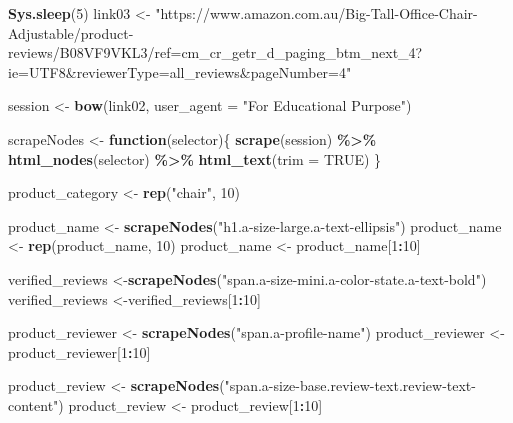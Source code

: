 \documentclass[
]{article}
\newenvironment{Shaded}{\begin{snugshade}}{\end{snugshade}}
\newcommand{\AttributeTok}[1]{\textcolor[rgb]{0.13,0.29,0.53}{#1}}
\newcommand{\ConstantTok}[1]{\textcolor[rgb]{0.56,0.35,0.01}{#1}}
\newcommand{\ControlFlowTok}[1]{\textcolor[rgb]{0.13,0.29,0.53}{\textbf{#1}}}
\newcommand{\DecValTok}[1]{\textcolor[rgb]{0.00,0.00,0.81}{#1}}
\newcommand{\FunctionTok}[1]{\textcolor[rgb]{0.13,0.29,0.53}{\textbf{#1}}}
\newcommand{\NormalTok}[1]{#1}
\newcommand{\OtherTok}[1]{\textcolor[rgb]{0.56,0.35,0.01}{#1}}
\newcommand{\SpecialCharTok}[1]{\textcolor[rgb]{0.81,0.36,0.00}{\textbf{#1}}}
\newcommand{\StringTok}[1]{\textcolor[rgb]{0.31,0.60,0.02}{#1}}
\begin{document}
\begin{Shaded}
\begin{Highlighting}[]
   \FunctionTok{Sys.sleep}\NormalTok{(}\DecValTok{5}\NormalTok{)}
\NormalTok{link03 }\OtherTok{\textless{}{-}} \StringTok{"https://www.amazon.com.au/Big{-}Tall{-}Office{-}Chair{-}Adjustable/product{-}reviews/B08VF9VKL3/ref=cm\_cr\_getr\_d\_paging\_btm\_next\_4?ie=UTF8\&reviewerType=all\_reviews\&pageNumber=4"}


\NormalTok{  session }\OtherTok{\textless{}{-}} \FunctionTok{bow}\NormalTok{(link02,}
               \AttributeTok{user\_agent =} \StringTok{"For Educational Purpose"}\NormalTok{)}

\NormalTok{  scrapeNodes }\OtherTok{\textless{}{-}} \ControlFlowTok{function}\NormalTok{(selector)\{}
    \FunctionTok{scrape}\NormalTok{(session) }\SpecialCharTok{\%\textgreater{}\%}
      \FunctionTok{html\_nodes}\NormalTok{(selector) }\SpecialCharTok{\%\textgreater{}\%}
      \FunctionTok{html\_text}\NormalTok{(}\AttributeTok{trim =} \ConstantTok{TRUE}\NormalTok{)}
\NormalTok{  \}}

\NormalTok{  product\_category }\OtherTok{\textless{}{-}} \FunctionTok{rep}\NormalTok{(}\StringTok{"chair"}\NormalTok{, }\DecValTok{10}\NormalTok{)}

\NormalTok{  product\_name }\OtherTok{\textless{}{-}} \FunctionTok{scrapeNodes}\NormalTok{(}\StringTok{"h1.a{-}size{-}large.a{-}text{-}ellipsis"}\NormalTok{)}
\NormalTok{  product\_name }\OtherTok{\textless{}{-}} \FunctionTok{rep}\NormalTok{(product\_name, }\DecValTok{10}\NormalTok{)}
\NormalTok{  product\_name }\OtherTok{\textless{}{-}}\NormalTok{ product\_name[}\DecValTok{1}\SpecialCharTok{:}\DecValTok{10}\NormalTok{]}
  
\NormalTok{  verified\_reviews }\OtherTok{\textless{}{-}}\FunctionTok{scrapeNodes}\NormalTok{(}\StringTok{"span.a{-}size{-}mini.a{-}color{-}state.a{-}text{-}bold"}\NormalTok{)}
\NormalTok{  verified\_reviews }\OtherTok{\textless{}{-}}\NormalTok{verified\_reviews[}\DecValTok{1}\SpecialCharTok{:}\DecValTok{10}\NormalTok{]}
  
\NormalTok{  product\_reviewer }\OtherTok{\textless{}{-}} \FunctionTok{scrapeNodes}\NormalTok{(}\StringTok{"span.a{-}profile{-}name"}\NormalTok{)}
\NormalTok{  product\_reviewer }\OtherTok{\textless{}{-}}\NormalTok{ product\_reviewer[}\DecValTok{1}\SpecialCharTok{:}\DecValTok{10}\NormalTok{]}
  
\NormalTok{  product\_review }\OtherTok{\textless{}{-}} \FunctionTok{scrapeNodes}\NormalTok{(}\StringTok{"span.a{-}size{-}base.review{-}text.review{-}text{-}content"}\NormalTok{)}
\NormalTok{  product\_review }\OtherTok{\textless{}{-}}\NormalTok{ product\_review[}\DecValTok{1}\SpecialCharTok{:}\DecValTok{10}\NormalTok{]}
  

\end{Highlighting}
\end{Shaded}
\end{document}
